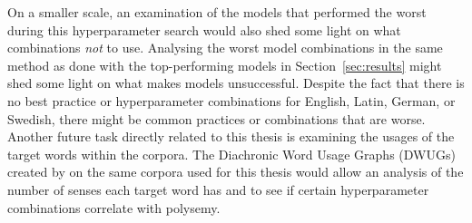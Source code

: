 On a smaller scale, an examination of the models that performed the worst during this hyperparameter search would also shed some light on what combinations \emph{not} to use. Analysing the worst model combinations in the same method as done with the top-performing models in Section~\ref{sec:results} might shed some light on what makes models unsuccessful. Despite the fact that there is no best practice or hyperparameter combinations for English, Latin, German, or Swedish, there might be common practices or combinations that are worse. Another future task directly related to this thesis is examining the usages of the target words within the corpora. The Diachronic Word Usage Graphs (DWUGs) created by \citet{schlectweg-dwug2021} on the same corpora used for this thesis would allow an analysis of the number of senses each target word has and to see if certain  hyperparameter combinations correlate with polysemy.

